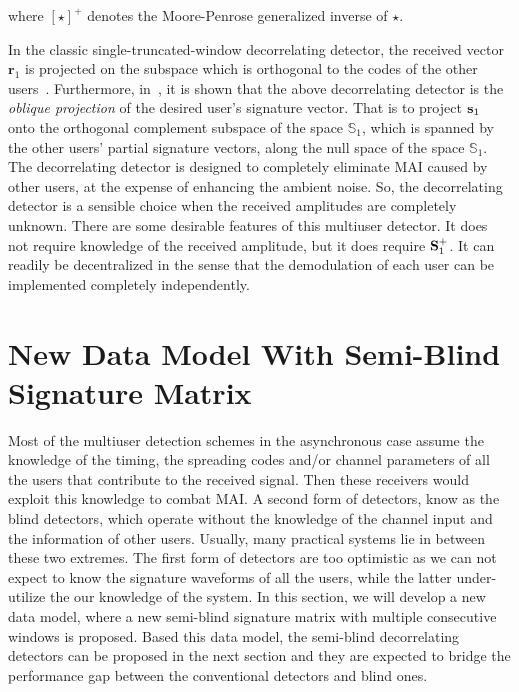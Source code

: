 \documentclass[a4paper,11pt,fleqn]{article}
\newcommand{\br}{{\mathbf r}}
\newcommand{\bs}{{\bf s}}
\newcommand{\bS}{{\bf S}}
\begin{document}
\noindent where $[\star]^+$ denotes the Moore-Penrose generalized
inverse of $\star$.

In the classic single-truncated-window decorrelating detector, the
received vector $\br_1$ is projected on the subspace which is
orthogonal to the codes of the other users~\cite{Verd98,Tse99}.
Furthermore, in~\cite{Elda02}, it is shown that the above
decorrelating detector is the {\em oblique projection} of the
desired user's signature vector. That is to project $\bs_1$ onto
the orthogonal complement subspace of the space $\mathbb{S}_1$,
which is spanned by the other users' partial signature vectors,
along the null space of the space $\mathbb{S}_1$. The
decorrelating detector is designed to completely eliminate MAI
caused by other users, at the expense of enhancing the ambient
noise. So, the decorrelating detector is a sensible choice when
the received amplitudes are completely unknown. There are some
desirable features of this multiuser detector. It does not require
knowledge of the received amplitude, but it does require
$\bS_1^+$. It can readily be decentralized in the sense that the
demodulation of each user can be implemented completely
independently.


\section{New Data Model With Semi-Blind Signature Matrix}

Most of the multiuser detection schemes in the asynchronous case
assume the knowledge of the timing, the spreading codes and/or
channel parameters of all the users that contribute to the
received signal. Then these receivers would exploit this knowledge
to combat MAI. A second form of detectors, know as the blind
detectors, which operate without the knowledge of the channel
input and the information of other users. Usually, many practical
systems lie in between these two extremes. The first form of
detectors are too optimistic as we can not expect to know the
signature waveforms of all the users, while the latter
under-utilize the our knowledge of the system. In this section, we
will develop a new data model, where a new semi-blind signature
matrix with multiple consecutive windows is proposed. Based this
data model, the semi-blind decorrelating detectors can be proposed
in the next section and they are expected to bridge the
performance gap between the conventional detectors and blind ones.
\end{document}
